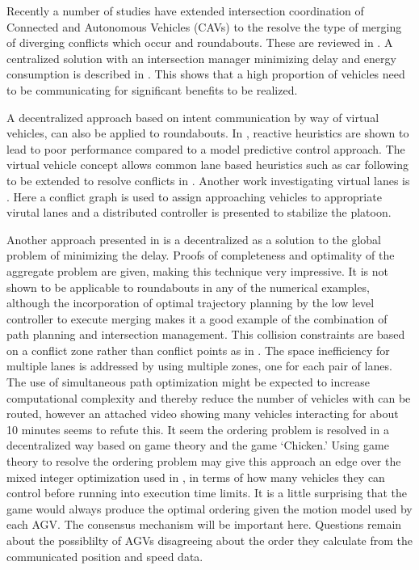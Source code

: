 \documentclass[11pt]{article} %
\begin{document}
Recently a number of studies have extended intersection coordination of Connected and Autonomous Vehicles (CAVs) to the resolve the type of merging of diverging conflicts which occur and roundabouts. These are reviewed in \cite{Rios-Torres2017}. A centralized solution with an intersection manager minimizing delay and energy consumption is described in \cite{Zhao2018}. This shows that a high proportion of vehicles need to be communicating for significant benefits to be realized. 

A decentralized approach based on intent communication by way of virtual vehicles, can also be applied to roundabouts. In \cite{Debada2016}, reactive heuristics are shown to lead to poor performance compared to a model predictive control approach. The virtual vehicle concept allows common lane based heuristics such as car following to be extended to resolve conflicts in  \cite{Debada2018}. Another work investigating virtual lanes is \cite{Xu2018}. Here a conflict graph is used to assign approaching vehicles to appropriate virutal lanes and a distributed controller is presented to stabilize the platoon.

Another approach presented in \cite{Liu2018} is a decentralized as a solution to the global problem of minimizing the delay. Proofs of completeness and optimality of the aggregate problem are given, making this technique very impressive. It is not shown to be applicable to roundabouts in any of the numerical examples, although the incorporation of optimal trajectory planning by the low level controller to execute merging makes it a good example of the combination of path planning and intersection management. This collision constraints are based on a conflict zone rather than conflict points as in \cite{Levin2017}. The space inefficiency for multiple lanes is addressed by using multiple zones, one for each pair of lanes. The use of simultaneous path optimization might be expected to increase computational complexity and thereby reduce the number of vehicles with can be routed, however an attached video showing many vehicles interacting for about 10 minutes seems to refute this. It seem the ordering problem is resolved in a decentralized way based on game theory and the game `Chicken.' Using game theory to resolve the ordering problem may give this approach an edge over the mixed integer optimization used in \cite{Levin2017}, in terms of how many vehicles they can control before running into execution time limits. It is a little surprising that the game would always produce the optimal ordering given the motion model used by each AGV. The consensus mechanism will be important here. Questions remain about the possiblilty of AGVs disagreeing about the order they calculate from the communicated position and speed data. 
\end{document}
